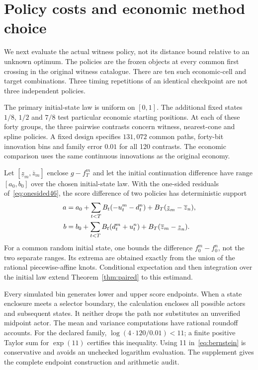 \section{Policy costs and economic method choice}\label{sec:direct47}
We next evaluate the actual witness policy, not its distance bound relative to an unknown optimum. The policies are the frozen objects at every common first crossing in the original witness catalogue. There are ten such economic-cell and target combinations. Three timing repetitions of an identical checkpoint are not three independent policies.

The primary initial-state law is uniform on $[0,1]$. The additional fixed states $1/8$, $1/2$ and $7/8$ test particular economic starting positions. At each of these forty groups, the three pairwise contrasts concern witness, nearest-cone and spline policies. A fixed design specifies $131{,}072$ common paths, forty-bit innovation bins and family error $0.01$ for all 120 contrasts. The economic comparison uses the same continuous innovations as the original economy.

Let $[\underline z_m,\overline z_m]$ enclose $g-f_T^m$ and let the initial continuation difference have range $[a_0,b_0]$ over the chosen initial-state law. With the one-sided residuals of~\eqref{eq:onesided46}, the score difference of two policies has deterministic support
\begin{align}\label{eq:directsupport47}
 a&=a_0+\sum_{t<T}B_t(-u_t^m-d_t^n)
                  +B_T(\underline z_m-\overline z_n),\\
 b&=b_0+\sum_{t<T}B_t(d_t^m+u_t^n)
                  +B_T(\overline z_m-\underline z_n).\notag
\end{align}
For a common random initial state, one bounds the difference $f_0^m-f_0^n$, not the two separate ranges. Its extrema are obtained exactly from the union of the rational piecewise-affine knots. Conditional expectation and then integration over the initial law extend Theorem~\ref{thm:paired} to this estimand.

Every simulated bin generates lower and upper score endpoints. When a state enclosure meets a selector boundary, the calculation encloses all possible actors and subsequent states. It neither drops the path nor substitutes an unverified midpoint actor. The mean and variance computations have rational roundoff accounts. For the declared family, $\log(4\cdot120/0.01)<11$; a finite positive Taylor sum for $\exp(11)$ certifies this inequality. Using 11 in~\eqref{eq:bernstein} is conservative and avoids an unchecked logarithm evaluation. The supplement gives the complete endpoint construction and arithmetic audit.

